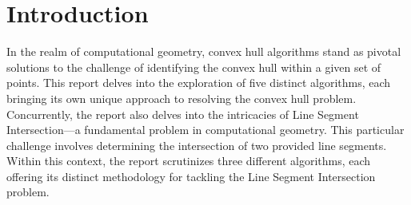 \section{\textbf{Introduction}}

In the realm of computational geometry, convex hull algorithms stand as pivotal solutions to the challenge of identifying the convex hull within a given set of points. This report delves into the exploration of five distinct algorithms, each bringing its own unique approach to resolving the convex hull problem. Concurrently, the report also delves into the intricacies of Line Segment Intersection—a fundamental problem in computational geometry. This particular challenge involves determining the intersection of two provided line segments. Within this context, the report scrutinizes
three different algorithms, each offering its distinct methodology for tackling the Line Segment Intersection problem.
